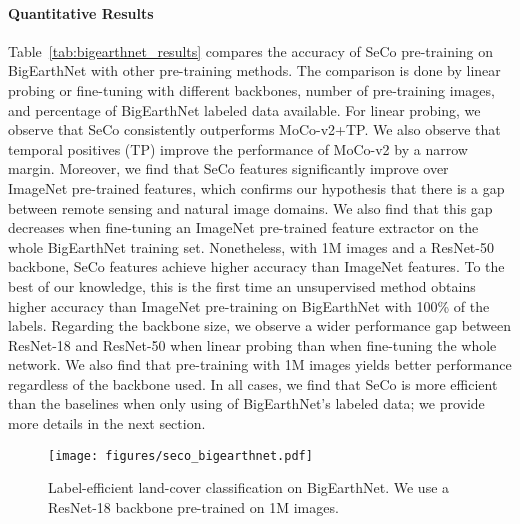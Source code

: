 \documentclass[10pt,twocolumn,letterpaper]{article}
\newcommand{\methodname}[0]{SeCo}
\begin{document}
\vspace{-1em}\paragraph{Quantitative Results}
Table~\ref{tab:bigearthnet_results} compares the accuracy of \methodname{} pre-training on BigEarthNet with other pre-training methods. The comparison is done by linear probing or fine-tuning with different backbones, number of pre-training images, and percentage of BigEarthNet labeled data available. For linear probing, we observe that \methodname{} consistently outperforms MoCo-v2+TP. We also observe that temporal positives (TP) improve the performance of MoCo-v2 by a narrow margin. Moreover, we find that \methodname{} features significantly improve over ImageNet pre-trained features, which confirms our hypothesis that there is a gap between remote sensing and natural image domains. We also find that this gap decreases when fine-tuning an ImageNet pre-trained feature extractor on the whole BigEarthNet training set. Nonetheless, with 1M images and a ResNet-50 backbone, \methodname{} features achieve  higher accuracy than ImageNet features. To the best of our knowledge, this is the first time an unsupervised method obtains higher accuracy than ImageNet pre-training on BigEarthNet with 100\% of the labels. Regarding the backbone size, we observe a wider performance gap between ResNet-18 and ResNet-50 when linear probing than when fine-tuning the whole network. We also find that pre-training with 1M images yields better performance regardless of the backbone used. In all cases, we find that \methodname{} is more efficient than the baselines when only using  of BigEarthNet's labeled data; we provide more details in the next section.

\begin{figure}[t]
    \begin{center}
    \texttt{[image: figures/seco\_bigearthnet.pdf]}
    \end{center}
    \caption{Label-efficient land-cover classification on BigEarthNet. We use a ResNet-18 backbone pre-trained on 1M images.}
    \label{fig:bigearthnet_results}
\end{figure}
\end{document}
